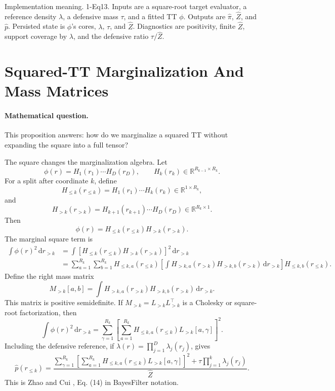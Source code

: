 \documentclass[11pt]{article}
\newcommand{\R}{\mathbb R}
\newcommand{\dd}{\,\mathrm d}
\begin{document}
Implementation meaning. 1-Eq13.  Inputs are a square-root target
evaluator, a reference density \(\lambda\), a defensive mass \(\tau\), and a
fitted TT \(\phi\).  Outputs are \(\widehat\pi\), \(\widehat Z\), and
\(\widehat p\).  Persisted state is \(\phi\)'s cores, \(\lambda\), \(\tau\),
and \(\widehat Z\).  Diagnostics are positivity, finite \(\widehat Z\), support
coverage by \(\lambda\), and the defensive ratio \(\tau/\widehat Z\).

\section{Squared-TT Marginalization And Mass Matrices}

\paragraph{Mathematical question.}
This proposition answers: how do we marginalize a squared TT without expanding
the square into a full tensor?

The square changes the marginalization algebra.  Let
\[
    \phi(r)=H_1(r_1)\cdots H_D(r_D),
    \qquad H_k(r_k)\in\R^{R_{k-1}\times R_k}.
\]
For a split after coordinate \(k\), define
\[
    H_{\le k}(r_{\le k})=H_1(r_1)\cdots H_k(r_k)\in\R^{1\times R_k},
\]
and
\[
    H_{>k}(r_{>k})=H_{k+1}(r_{k+1})\cdots H_D(r_D)\in\R^{R_k\times 1}.
\]
Then
\[
    \phi(r)=H_{\le k}(r_{\le k})H_{>k}(r_{>k}).
\]
The marginal square term is
\[
\begin{aligned}
 \int \phi(r)^2\dd r_{>k}
 &=
 \int
 \left[
 H_{\le k}(r_{\le k})H_{>k}(r_{>k})
 \right]^2\dd r_{>k}\\
 &=
 \sum_{a=1}^{R_k}\sum_{b=1}^{R_k}
 H_{\le k,a}(r_{\le k})
 \left[
 \int H_{>k,a}(r_{>k})H_{>k,b}(r_{>k})\dd r_{>k}
 \right]
 H_{\le k,b}(r_{\le k}).
\end{aligned}
\label{eq:p24-m1}
\]
Define the right mass matrix
\[
    M_{>k}[a,b]
    =
    \int H_{>k,a}(r_{>k})H_{>k,b}(r_{>k})\dd r_{>k}.
    \label{eq:p24-m2}
\]
This matrix is positive semidefinite.  If \(M_{>k}=L_{>k}L_{>k}^\top\) is a
Cholesky or square-root factorization, then
\[
    \int \phi(r)^2\dd r_{>k}
    =
    \sum_{\gamma=1}^{R_k}
    \left[
    \sum_{a=1}^{R_k}H_{\le k,a}(r_{\le k})L_{>k}[a,\gamma]
    \right]^2.
    \label{eq:p24-m3}
\]
Including the defensive reference, if
\(\lambda(r)=\prod_{j=1}^D\lambda_j(r_j)\), gives
\[
    \widehat p(r_{\le k})
    =
    \frac{
    \sum_{\gamma=1}^{R_k}
    \left[
    \sum_{a=1}^{R_k}H_{\le k,a}(r_{\le k})L_{>k}[a,\gamma]
    \right]^2
    +
    \tau\prod_{j=1}^k\lambda_j(r_j)}
    {\widehat Z}.
    \label{eq:p24-m4}
\]
This is Zhao and Cui \cite{zhao2024ttsequential}, Eq. (14) in BayesFilter notation.
\end{document}
